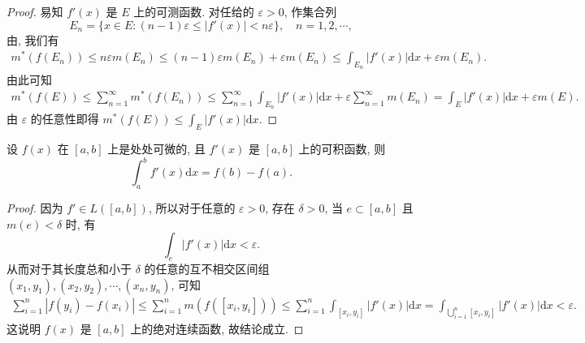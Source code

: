 \documentclass[../../main.tex]{subfiles}%
\begin{document}
\begin{proof}

易知 $f'(x)$ 是 $E$ 上的可测函数. 对任给的 $\varepsilon>0$, 作集合列
\[
E_n = \{x\in E: (n-1)\varepsilon\leqslant|f'(x)|<n\varepsilon\}, \quad n=1,2,\cdots,
\]
由, 我们有
\begin{align*}
m^*(f(E_n)) \leqslant n\varepsilon m(E_n) \leqslant (n-1)\varepsilon m(E_n) + \varepsilon m(E_n) 
\leqslant \int_{E_n} |f'(x)|\mathrm{d}x + \varepsilon m(E_n).
\end{align*}
由此可知
\begin{align*}
m^*(f(E)) \leqslant \sum_{n=1}^{\infty} m^*(f(E_n)) 
\leqslant \sum_{n=1}^{\infty} \int_{E_n} |f'(x)|\mathrm{d}x + \varepsilon \sum_{n=1}^{\infty} m(E_n) = \int_E |f'(x)|\mathrm{d}x + \varepsilon m(E).
\end{align*}
由 $\varepsilon$ 的任意性即得 $m^*(f(E))\leqslant\int_E |f'(x)|\mathrm{d}x$.

\end{proof}

\begin{proposition}
设 $f(x)$ 在 $[a,b]$ 上是处处可微的, 且 $f'(x)$ 是 $[a,b]$ 上的可积函数, 则
\[
\int_a^b f'(x)\mathrm{d}x = f(b)-f(a).
\]
\end{proposition}
\begin{proof}

因为 $f'\in L([a,b])$, 所以对于任意的 $\varepsilon>0$, 存在 $\delta>0$, 当 $e\subset[a,b]$ 且 $m(e)<\delta$ 时, 有
\[
\int_e |f'(x)|\mathrm{d}x < \varepsilon.
\]
从而对于其长度总和小于 $\delta$ 的任意的互不相交区间组 $(x_1,y_1), (x_2,y_2), \cdots, (x_n,y_n)$, 可知
\begin{align*}
\sum_{i=1}^n |f(y_i)-f(x_i)| \leqslant \sum_{i=1}^n m(f([x_i,y_i])) \leqslant \sum_{i=1}^n \int_{[x_i,y_i]} |f'(x)|\mathrm{d}x = \int_{\bigcup_{i=1}^n [x_i,y_i]} |f'(x)|\mathrm{d}x < \varepsilon.
\end{align*}
这说明 $f(x)$ 是 $[a,b]$ 上的绝对连续函数, 故结论成立.

\end{proof}
\end{document}
